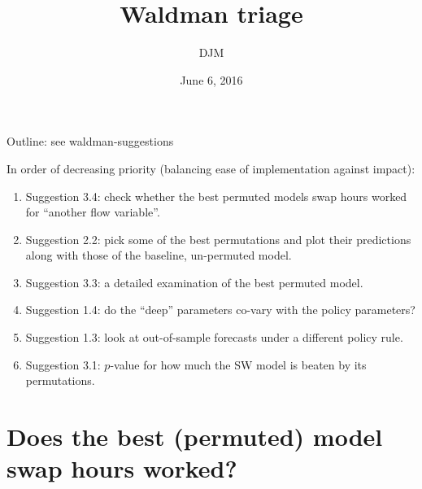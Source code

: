 \documentclass[]{article}
\title{Waldman triage}
\author{DJM}
\date{June 6, 2016}
\begin{document}
\maketitle

Outline: see waldman-suggestions

In order of decreasing priority (balancing ease of implementation
against impact):

\begin{enumerate}
\item Suggestion 3.4: check whether the best permuted models swap hours worked
  for ``another flow variable''.
\item Suggestion 2.2: pick some of the best permutations and plot their
  predictions along with those of the baseline, un-permuted model.
\item Suggestion 3.3: a detailed examination of the best permuted model.
\item Suggestion 1.4: do the ``deep'' parameters co-vary with the policy parameters?
\item Suggestion 1.3: look at out-of-sample forecasts under a different policy
  rule.
\item Suggestion 3.1: $p$-value for how much the SW model is beaten by its
  permutations.
\end{enumerate}

\hypertarget{does-the-best-permuted-model-swap-hours-worked}{%
\section{Does the best (permuted) model swap hours
worked?}\label{does-the-best-permuted-model-swap-hours-worked}}
\end{document}
